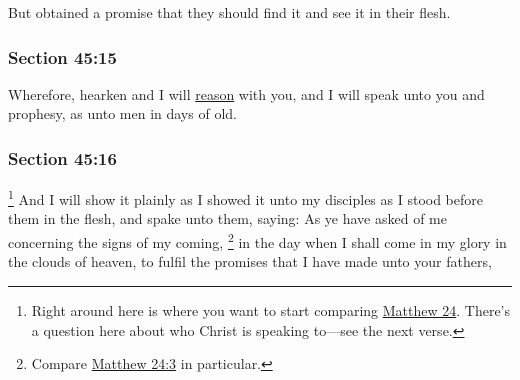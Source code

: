 		But obtained a promise that they should find it and see it in their flesh.


	\subsubsection{Section 45:15} %
		\label{DC45-15}

		Wherefore, hearken and I will \hyperref[REASON]{reason} with you, and I will speak unto you and prophesy, as unto men in days of old.


	\subsubsection{Section 45:16} %
		\label{DC45-16}

			\footnote{%
				Right around here is where you want to start comparing \hyperref[MATTHEW-24]{Matthew 24}. There's a question here about who Christ is speaking to---see the next verse.
				}%
		And I will show it plainly as I showed it unto my disciples as I stood before them in the flesh, and spake unto them, saying: As ye have asked of me concerning the signs of my coming,%
			\footnote{%
				Compare \hyperref[MATTHEW-24-3]{Matthew 24:3} in particular.
				}
		in the day when I shall come in my glory in the clouds of heaven, to fulfil the promises that I have made unto your fathers,


